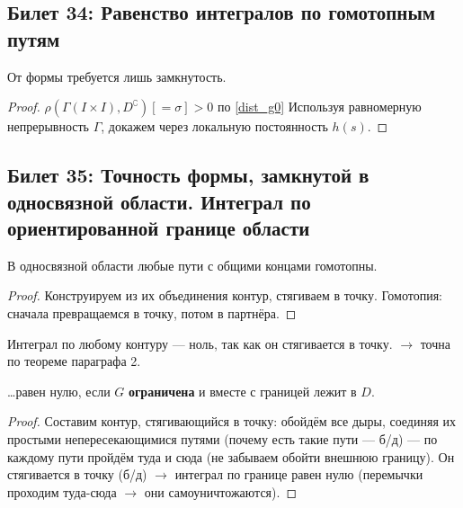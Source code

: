\documentclass[12pt, a4paper, oneside]{memoir}
\begin{document}
\subsection{Билет 34: Равенство интегралов по гомотопным путям}


\begin{theorem}

    От формы требуется лишь замкнутость.

    \begin{proof}
        $\rho\left(\Gamma(I×I), D^\complement\right) [ = \sigma] > 0$ по \ref{dist_g0}
        Используя равномерную непрерывность $\Gamma$, докажем через локальную постоянность $h(s)$.
    \end{proof}
\end{theorem}



\subsection{Билет 35: Точность формы, замкнутой в односвязной области. Интеграл по ориентированной границе области}

\begin{lemma}
    В односвязной области любые пути с общими концами гомотопны.

    \begin{proof}
        Конструируем из их объединения контур, стягиваем в точку.
        Гомотопия: сначала превращаемся в точку, потом в партнёра.
    \end{proof}
\end{lemma}


\begin{theorem}
    Интеграл по любому контуру — ноль, так как он стягивается в точку. $→$ точна по теореме параграфа 2.
\end{theorem}


\begin{theorem}

    …равен нулю, если $G$ \textbf{ограничена} и вместе с границей лежит в $D$.

    \begin{proof}
        Составим контур, стягивающийся в точку: обойдём все дыры,
        соединяя их простыми непересекающимися путями (почему есть такие пути — б/д) 
        — по каждому пути пройдём туда и сюда (не забываем обойти внешнюю границу).
        Он стягивается в точку (б/д) $→$ интеграл по границе равен нулю (перемычки проходим туда-сюда $→$ они самоуничтожаются).
    \end{proof}
\end{theorem}
\end{document}
